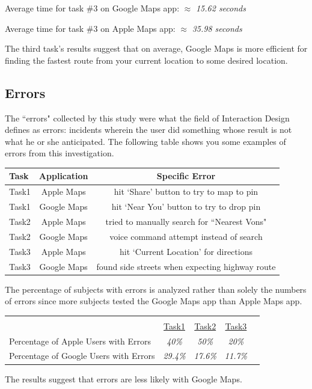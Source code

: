 \documentclass[a4paper; 11pt]{article}
\begin{document}
\begin{center}
\vspace{-.6in}

\par
Average time for task \#3 on Google Maps app: $ \approx $ \textit{15.62 seconds}
\par
Average time for task \#3 on Apple Maps app: $ \approx $ \textit{35.98 seconds}
\end{center}
\par
\noindent
The third task's results suggest that on average, Google Maps is more efficient for finding the fastest route from your current location to some desired location. 
\clearpage
\subsection{Errors}
\par
The ``errors" collected by this study were what the field of Interaction Design defines as errors: incidents wherein the user did something whose result is not what he or she anticipated. The following table shows you some examples of errors from this investigation.

\begin{table}[ht]
\centering
\begin{tabular}{l|c|c}
Task & Application & Specific Error\\\hline
Task1 & Apple Maps & hit `Share' button to try to map to pin \\
Task1 & Google Maps & hit `Near You' button to try to drop pin\\
Task2 & Apple Maps & tried to manually search for ``Nearest Vons"\\
Task2 & Google Maps & voice command attempt instead of search\\
Task3 & Apple Maps & hit `Current Location' for directions\\
Task3 & Google Maps & found side streets when expecting highway route
\end{tabular}
\end{table}
\par
The percentage of subjects with errors is analyzed rather than solely the numbers of errors since more subjects tested the Google Maps app than Apple Maps app.
\begin{table}[ht]
\begin{tabular}{l c c c c}
& \multicolumn{4}{c}{}\\ %
& \underline{Task1} & \underline{Task2} & \underline{Task3} \\
Percentage of Apple Users with Errors & \textit{40\%} & \textit{50\%}  & \textit{20\%} \\
Percentage of Google Users with Errors & \textit{29.4\%} & \textit{17.6\%}  & \textit{11.7\%} \\

\end{tabular}

\end{table}
\par
The results suggest that errors are less likely with Google Maps.
\end{document}
